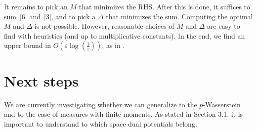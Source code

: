 \documentclass[12pt]{report}
\theoremstyle{definition}
\theoremstyle{remark}
\begin{document}
It remains to pick an $M$ that minimizes the RHS. After this is done, it suffices to sum~\eqref{6} and~\eqref{3}, and to pick a $\Delta$ that minimizes the sum. Computing the optimal $M$ and $\Delta$ is not possible. However, reasonable choices of $M$ and $\Delta$ are easy to find with heuristics (and up to multiplicative constants). In the end, we find an upper bound in $O\left(\varepsilon \log\left(\frac 1\varepsilon \right)\right)$, as in \cite{genevay2018sample}.

\section{Next steps}

\hspace{\parindent} We are currently investigating whether we can generalize \cite{mena2019statistical} to the $p$-Wasserstein and to the case of measures with finite moments. As stated in Section 3.1, it is important to understand to which space dual potentials belong.

\newpage 


\end{document}
